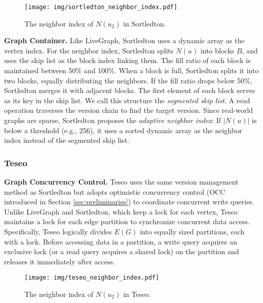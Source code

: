 \begin{figure}[h]\small
    \setlength{\abovecaptionskip}{3pt}
    \setlength{\belowcaptionskip}{0pt}
    \texttt{[image: img/sortledton\_neighbor\_index.pdf]}
    \centering
    \caption{The neighbor index of $N(u_2)$ in Sortledton.}
    \label{fig:sortledton_neighbor_index}
\end{figure}

\noindent\textbf{Graph Container.} Like LiveGraph, Sortledton uses a dynamic array as the vertex index. For the neighbor index, Sortledton splits $N(u)$ into blocks $B$, and uses the skip list as the block index linking them. The fill ratio of each block is maintained between 50\% and 100\%. When a block is full, Sortledton splits it into two blocks, equally distributing the neighbors. If the fill ratio drops below 50\%, Sortledton merges it with adjacent blocks. The first element of each block serves as its key in the skip list. We call this structure the \emph{segmented skip list}. A read operation traverses the version chain to find the target version. Since real-world graphs are sparse, Sortledton proposes the \emph{adaptive neighbor index}: If $|N(u)|$ is below a threshold (e.g., 256), it uses a sorted dynamic array as the neighbor index instead of the segmented skip list.

\subsubsection{\textbf{Teseo}~\cite{de2021teseo}}

\noindent\textbf{Graph Concurrency Control.} Teseo uses the same version management method as Sortledton but adopts optimistic concurrency control (OCC introduced in Section \ref{sec:preliminaries}) to coordinate concurrent write queries. Unlike LiveGraph and Sortledton, which keep a lock for each vertex, Teseo maintains a lock for each edge partition to synchronize concurrent data access. Specifically, Teseo logically divides $E(G)$ into equally sized partitions, each with a lock. Before accessing data in a partition, a write query acquires an exclusive lock (or a read query acquires a shared lock) on the partition and releases it immediately after access.


\begin{figure}[h]\small
    \texttt{[image: img/teseo\_neighbor\_index.pdf]}
    \centering
    \caption{The neighbor index of $N(u_2)$ in Teseo.}
    \label{fig:teseo_neighbor_index}
\end{figure}


